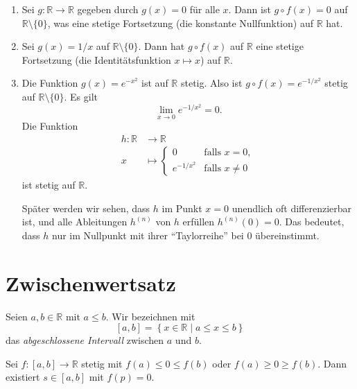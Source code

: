 \documentclass[../main.tex]{subfiles}
\begin{document}
\begin{examples}
  \leavevmode
  \begin{enumerate}[(1)]
    \item Sei $g \colon \mathbb{R} \to \mathbb{R}$ gegeben
      durch $g(x) = 0$ für alle $x$. Dann ist
      $g \circ f(x) = 0$ auf $\mathbb{R} \setminus \{0\}$,
      was eine stetige Fortsetzung (die konstante Nullfunktion)
      auf $\mathbb{R}$ hat.
    \item Sei $g(x) = 1/x$ auf $\mathbb{R} \setminus \{0\}$.
      Dann hat $g \circ f(x)$ auf $\mathbb{R}$ 
      eine stetige Fortsetzung (die Identitätsfunktion $x
      \mapsto x$) auf $\mathbb{R}$.
    \item Die Funktion $g(x) = e^{-x^2}$ ist auf $\mathbb{R}$ 
      stetig.
      Also ist $g \circ f(x) = e^{-1/x^2}$ stetig
      auf $\mathbb{R} \setminus \{0\}$.
      Es gilt
      \[
        \lim_{x \to 0}e^{-1/x^2} = 0.
      \]
      Die Funktion
      \begin{align*}
        h \colon \mathbb{R} & \to \mathbb{R} \\
        x & \mapsto 
        \begin{cases}
          0 & \text{falls } x = 0, \\
          e^{-1/x^2} & \text{falls } x \neq 0
        \end{cases}
      \end{align*}
      ist stetig auf $\mathbb{R}$.

      Später werden wir sehen,
      dass $h$ im Punkt $x = 0$ unendlich oft differenzierbar
      ist, und alle Ableitungen $h^{(n)}$ von $h$
      erfüllen $h^{(n)}(0) = 0$.
      Das bedeutet, dass $h$ nur im Nullpunkt
      mit ihrer ``Taylorreihe'' bei $0$
      übereinstimmt.
  \end{enumerate}
\end{examples}


\section{Zwischenwertsatz}

Seien $a, b \in \mathbb{R}$ mit $a \leq b$.
Wir bezeichnen mit
\[
  [a, b] = \left\{x \in \mathbb{R} \mid a \leq x \leq b\right\}
\]
das \emph{abgeschlossene Intervall} zwischen $a$ und $b$.

\begin{theorem}\label{thm:pre-zwischen}
  Sei $f \colon [a, b] \to \mathbb{R}$ stetig
  mit $f(a) \leq 0 \leq f(b)$ oder
  $f (a) \geq 0 \geq f(b)$. Dann existiert $s \in [a, b]$ 
  mit $f(p) = 0$.
\end{theorem}
\end{document}
